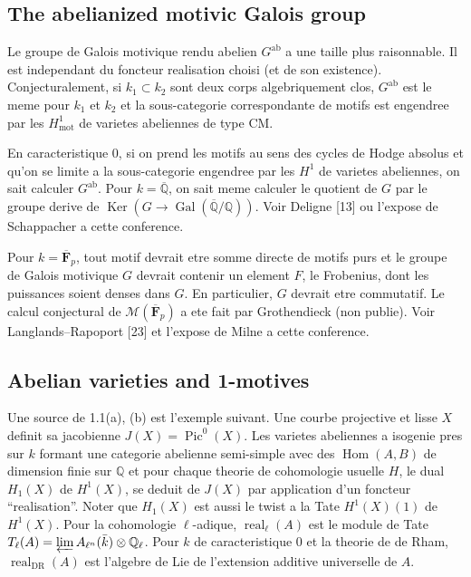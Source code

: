\documentclass[11pt,a4paper]{article}
\theoremstyle{plain}
\theoremstyle{definition}
\DeclareMathOperator{\Hom}{Hom}
\DeclareMathOperator{\Ker}{Ker}
\DeclareMathOperator{\Gal}{Gal}
\DeclareMathOperator{\Pic}{Pic}
\newcommand{\Q}{\mathbb{Q}}
\newcommand{\Qell}{\mathbb{Q}_\ell}
\DeclareMathOperator{\mot}{mot}
\DeclareMathOperator{\real}{real}
\DeclareMathOperator{\DR}{DR}
\newcommand{\ab}{\mathrm{ab}}
\begin{document}
\subsection{The abelianized motivic Galois group}

Le groupe de Galois motivique rendu abelien $G^{\ab}$ a une taille plus raisonnable. Il est independant du foncteur realisation choisi (et de son existence). Conjecturalement, si $k_1 \subset k_2$ sont deux corps algebriquement clos, $G^{\ab}$ est le meme pour $k_1$ et $k_2$ et la sous-categorie correspondante de motifs est engendree par les $H^1_{\mot}$ de varietes abeliennes de type CM.

En caracteristique $0$, si on prend les motifs au sens des cycles de Hodge absolus et qu'on se limite a la sous-categorie engendree par les $H^1$ de varietes abeliennes, on sait calculer $G^{\ab}$. Pour $k = \overline{\Q}$, on sait meme calculer le quotient de $G$ par le groupe derive de $\Ker(G \to \Gal(\overline{\Q}/\Q))$. Voir Deligne [13] ou l'expose de Schappacher a cette conference.

Pour $k = \overline{\mathbf{F}}_p$, tout motif devrait etre somme directe de motifs purs et le groupe de Galois motivique $G$ devrait contenir un element $F$, le Frobenius, dont les puissances soient denses dans $G$. En particulier, $G$ devrait etre commutatif. Le calcul conjectural de $\mathcal{M}(\overline{\mathbf{F}}_p)$ a ete fait par Grothendieck (non publie). Voir Langlands--Rapoport [23] et l'expose de Milne a cette conference.

\subsection{Abelian varieties and 1-motives}

Une source de 1.1(a), (b) est l'exemple suivant. Une courbe projective et lisse $X$ definit sa jacobienne $J(X) = \Pic^0(X)$. Les varietes abeliennes a isogenie pres sur $k$ formant une categorie abelienne semi-simple avec des $\Hom(A, B)$ de dimension finie sur $\Q$ et pour chaque theorie de cohomologie usuelle $H$, le dual $H_1(X)$ de $H^1(X)$, se deduit de $J(X)$ par application d'un foncteur ``realisation''. Noter que $H_1(X)$ est aussi le twist a la Tate $H^1(X)(1)$ de $H^1(X)$. Pour la cohomologie $\ell$-adique, $\real_{\ell}(A)$ est le module de Tate $T_{\ell}(A) = \varprojlim A_{\ell^n}(\bar{k}) \otimes \Qell$. Pour $k$ de caracteristique $0$ et la theorie de de Rham, $\real_{\DR}(A)$ est l'algebre de Lie de l'extension additive universelle de $A$.
\end{document}
